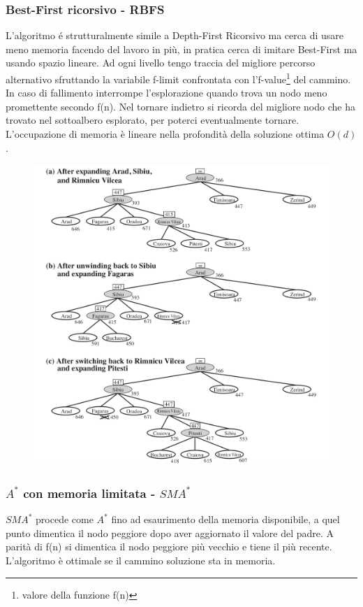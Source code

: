 \documentclass{article}
\begin{document}
\subsubsection{Best-First ricorsivo - RBFS}
L'algoritmo é strutturalmente simile a Depth-First Ricorsivo ma cerca di usare meno memoria facendo del lavoro in più, in pratica cerca di imitare Best-First ma usando spazio lineare. Ad ogni livello tengo traccia del migliore percorso alternativo sfruttando la variabile f-limit confrontata con l'f-value\footnote{valore della funzione f(n)} del cammino. In caso di fallimento interrompe l'esplorazione quando trova un nodo meno promettente secondo f(n). Nel tornare indietro si ricorda del migliore nodo che ha trovato nel sottoalbero esplorato, per poterci eventualmente tornare. L'occupazione di memoria è lineare nella profondità della soluzione ottima $O(d)$.
\begin{figure}[H]
    \centering
    \includegraphics[scale=0.5]{Images/rbfsalg.png}
\end{figure}

\subsubsection{$A^*$ con memoria limitata - $SMA^*$}
$SMA^*$ procede come $A^*$ fino ad esaurimento della memoria disponibile, a quel punto dimentica il nodo peggiore dopo aver aggiornato il valore del padre. A parità di f(n) si dimentica il nodo peggiore più vecchio e tiene il più recente. L'algoritmo è ottimale se il cammino soluzione sta in memoria.
\clearpage
\end{document}
